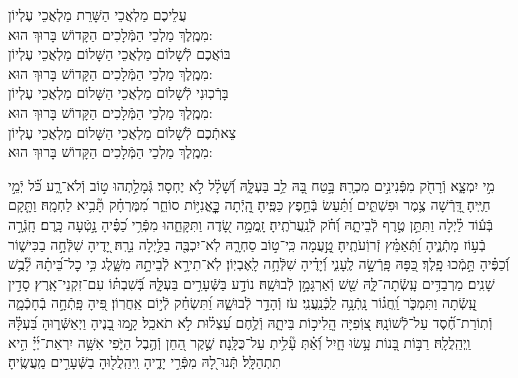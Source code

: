 \documentclass[twoside, openany, parskip=half, 11pt]{book}
\begin{document}
\birkashabonim

\medskip



 עֲלֵיכֶם מַלְאֲכֵי הַשָּׁרֵת מַלְאֲכֵי עֶלְיוֹן\\ מִמֶֽלֶךְ מַלְכֵי הַמְּֿלָכִים הַקָּדוֹשׁ בָּרוּךְ הוּא: \\
בּוֹאֲכֶם לְֿשָׁלוֹם מַלְאֲכֵי הַשָּׁלוֹם מַלְאֲכֵי עֶלְיוֹן\\ מִמֶֽלֶךְ מַלְכֵי הַמְּֿלָכִים הַקָּדוֹשׁ בָּרוּךְ הוּא:\\
בָּרְֿכֽוּנִי לְֿשָׁלוֹם מַלְאֲכֵי הַשָּׁלוֹם מַלְאֲכֵי עֶלְיוֹן \\ מִמֶֽלֶךְ מַלְכֵי הַמְּֿלָכִים הַקָּדוֹשׁ בָּרוּךְ הוּא:\\
צֵאתְֿכֶם לְֿשָׁלוֹם מַלְאֲכֵי הַשָּׁלוֹם מַלְאֲכֵי עֶלְיוֹן\\ מִמֶֽלֶךְ מַלְכֵי הַמְּֿלָכִים הַקָּדוֹשׁ בָּרוּךְ הוּא:

\vfill
\clearpage


 מִ֣י יִמְצָ֑א וְֿרָחֹ֖ק מִפְּֿנִינִ֣ים מִכְרָֽהּ׃ \hfill \break
בָּ֣טַח בָּ֭הּ לֵ֥ב בַּעְלָּ֑הּ וְֿ֝שָׁלָ֗ל לֹ֣א יֶחְסָר׃ \hfill \break
גְּֿמָלַ֣תְהוּ ט֣וֹב וְֿלֹא־רָ֑ע כֹּ֝֗ל יְֿמֵ֣י חַיֶּֽיהָ׃ \hfill \break
דָּֽ֭רְֿשָׁה צֶ֥מֶר וּפִשְׁתִּ֑ים וַ֝תַּ֗עַשׂ בְּֿחֵ֣פֶץ כַּפֶּֽיהָ׃ \hfill \break
הָֽ֭יְֿתָה כׇׇׇׇׇׇׇׇׇׇׇׇׇׇׇׇָּֽאֳנִיּ֣וֹת סוֹחֵ֑ר מִ֝מֶּרְחָ֗ק תָּ֘בִ֥יא לַחְמָֽהּ׃ \hfill \break
וַתָּ֤קָם בְּֿע֬וֹד לַ֗יְלָה וַתִּתֵּ֣ן טֶ֣רֶף לְֿבֵיתָ֑הּ וְֿ֝חֹ֗ק לְֿנַֽעֲרֹתֶֽיהָ׃ \hfill \break
זָֽמֲמָ֣ה שָׂ֭דֶה וַתִּקָּחֵ֑הוּ מִפְּֿרִ֥י כַ֝פֶּ֗יהָ נָ֣טְֿעָה כָּֽרֶם׃ \hfill \break
חָֽגְֿרָ֣ה בְֿע֣וֹז מָתְֿנֶ֑יהָ וַ֝תְּֿאַמֵּ֗ץ זְֿרוֹֽעֹתֶֽיהָ׃ \hfill \break
טָֽ֣֭עֲמָה כִּֽי־ט֣וֹב סַחְרָ֑הּ לֹֽא־יִכְבֶּ֖ה בַלַּ֣יְלָה נֵרָֽהּ׃ \hfill \break
יָ֭דֶיהָ שִׁלְּֿחָ֣ה בַכִּישׁ֑וֹר וְֿ֝כַפֶּ֗יהָ תָּ֣מְֿכוּ פָֽלֶךְ׃ \hfill \break
כַּ֭פָּהּ פָּֽרְֿשָׂ֣ה לֶֽעָנִ֑י וְֿ֝יָדֶ֗יהָ שִׁלְּֿחָ֥ה לָֽאֶבְיֽוֹן׃ \hfill \break
לֹֽא־תִירָ֣א לְֿבֵיתָ֣הּ מִשָּׁ֑לֶג כִּ֥י כׇל־בֵּ֝יתָ֗הּ לָ֘בֻ֥שׁ שָׁנִֽים׃ \hfill \break
מַרְבַדִּ֥ים עָֽשְֿׂתָה־לָּ֑הּ שֵׁ֖שׁ וְֿאַרְגָּמָ֣ן לְֿבוּשָֽׁהּ׃ \hfill \break
נוֹדָ֣ע בַּשְּֿׁעָרִ֣ים בַּעְלָּ֑הּ בְּֿ֝שִׁבְתּ֗וֹ עִם־זִקְנֵי־אָֽרֶץ׃ \hfill \break
סָדִ֣ין עָֽ֭שְֿׂתָה וַתִּמְכֹּ֑ר וַֽ֝חֲג֗וֹר נָֽתְֿנָ֥ה לַֽכְּֿנַֽעֲנִֽי׃ \hfill \break
עֹז וְֿהָדָ֣ר לְֿבוּשָׁ֑הּ וַ֝תִּשְׂחַ֗ק לְֿי֣וֹם אַֽחֲרֽוֹן׃ \hfill \break
פִּ֭יהָ פָּֽתְֿחָ֣ה בְֿחָכְֿמָ֑ה וְֿתֽוֹרַת־חֶ֝֗סֶד עַל־לְֿשׁוֹנָֽהּ׃ \hfill \break
צ֭וֹֽפִיָּה הֲֽלִיכ֣וֹת בֵּיתָ֑הּ וְֿלֶ֥חֶם עַ֝צְל֗וּת לֹ֣א תֹאכֵֽל׃ \hfill \break
קָ֣מוּ בָ֭נֶיהָ וַיְאַשְּֿׁר֑וּהָ בַּ֝עְלָּ֗הּ וַֽיְהַֽלֲלָֽהּ׃ \hfill \break
רַבּ֣וֹת בָּ֭נוֹת עָ֥שׂוּ חָ֑יִל וְֿ֝אַ֗תְּ עָ֘לִ֥יתְ עַל־כֻּלָּֽנָה׃ \hfill \break
שֶׁ֣קֶר הַ֭חֵן וְֿהֶ֣בֶל הַיֹּ֑פִי אִשָּׁ֥ה יִרְאַת־יְ֜יָ֗ הִ֣יא תִתְהַלָּֽל׃\hfill \break
תְּֽֿנוּ־לָ֭הּ מִפְּֿרִ֣י יָדֶ֑יהָ וִֽיהַֽלֲל֖וּהָ בַשְּֿׁעָרִ֣ים מַֽעֲשֶֽׂיהָ׃\hfill \break
\end{document}
